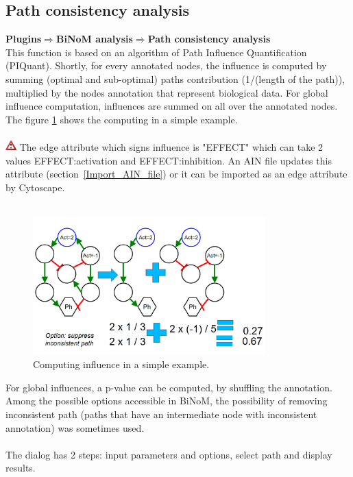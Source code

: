 \subsection{Path consistency analysis}
\textbf{Plugins$\Rightarrow$BiNoM analysis$\Rightarrow$Path consistency analysis}\\
This function is based on an algorithm of  Path Influence Quantification (PIQuant). Shortly, for every annotated nodes, the influence is computed by summing (optimal and sub-optimal) paths contribution (1/(length of the path)), multiplied by the nodes annotation that represent biological data. For global influence computation, influences are summed on all over the annotated nodes. The figure \ref{PIQuant_example} shows the computing in a simple example.\\\\
\includegraphics[width=12pt,height=12pt]{graphics/warning} The edge attribute which signs influence is "EFFECT" which can take 2 values EFFECT:activation and EFFECT:inhibition. An AIN file updates this attribute (section~\ref{Import_AIN_file}) or it can be imported as an edge attribute by Cytoscape.\\\\
\begin{figure}
\centering
\includegraphics[width=0.8\textwidth]{graphics/PIQuant_example}
\caption{Computing influence in a simple example.}
\label{PIQuant_example}
\end{figure}
For global influences, a p-value can be computed, by shuffling the annotation. Among the possible options accessible in BiNoM, the possibility of removing inconsistent path (paths that have an intermediate node with inconsistent annotation) was sometimes used.\\\\
The dialog has 2 steps: input parameters and options, select path and display results.\\\\
